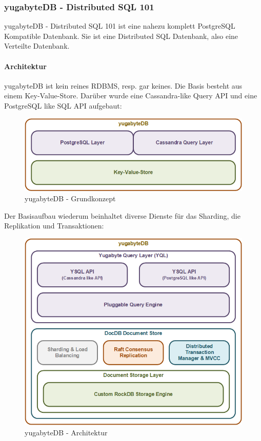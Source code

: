 
\begin{flushleft}
    \subsubsection{yugabyteDB - Distributed SQL 101}
    yugabyteDB - Distributed SQL 101 ist eine nahezu komplett \Gls{PostgreSQL} Kompatible Datenbank.
    Sie ist eine Distributed SQL Datenbank, also eine Verteilte Datenbank\cite{ZXD6D9KU}.
\end{flushleft}
\begin{flushleft}
    \paragraph{Architektur}
    yugabyteDB ist kein reines \Gls{RDBMS}, resp. gar keines.
    Die Basis besteht aus einem \Gls{Key-Value-Store}.
    Darüber wurde eine \Gls{Cassandra}-like Query API und eine PostgreSQL like SQL API aufgebaut:
    \begin{figure}[H]
        \centering
        \includegraphics[width=0.8\linewidth]{source/implementation/evaluation/postgresql_ha_solutions/yugabytedb/yugabytedb-concept}
        \caption{yugabyteDB - Grundkonzept}
        \label{fig:yugabytedb-concept}
    \end{figure}

    Der Basisaufbau wiederum beinhaltet diverse Dienste für das Sharding, die Replikation und Transaktionen:
    \begin{figure}[H]
        \centering
        \includegraphics[width=0.8\linewidth]{source/implementation/evaluation/postgresql_ha_solutions/yugabytedb/yugabytedb-basic-archicture}
        \caption{yugabyteDB - Architektur}
        \label{fig:yugabytedb-basic-archicture}
    \end{figure}


\end{flushleft}
